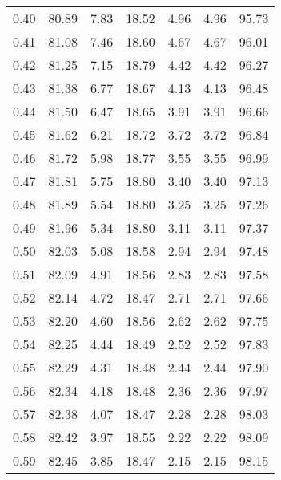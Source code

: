 \begin{tabular}{|c|c|c|c|c|c|c|}
      0.40 &     80.89 &      7.83 &      18.52 &    4.96 &       4.96 &         95.73 \\
      0.41 &     81.08 &      7.46 &      18.60 &    4.67 &       4.67 &         96.01 \\
      0.42 &     81.25 &      7.15 &      18.79 &    4.42 &       4.42 &         96.27 \\
      0.43 &     81.38 &      6.77 &      18.67 &    4.13 &       4.13 &         96.48 \\
      0.44 &     81.50 &      6.47 &      18.65 &    3.91 &       3.91 &         96.66 \\
      0.45 &     81.62 &      6.21 &      18.72 &    3.72 &       3.72 &         96.84 \\
      0.46 &     81.72 &      5.98 &      18.77 &    3.55 &       3.55 &         96.99 \\
      0.47 &     81.81 &      5.75 &      18.80 &    3.40 &       3.40 &         97.13 \\
      0.48 &     81.89 &      5.54 &      18.80 &    3.25 &       3.25 &         97.26 \\
      0.49 &     81.96 &      5.34 &      18.80 &    3.11 &       3.11 &         97.37 \\
      0.50 &     82.03 &      5.08 &      18.58 &    2.94 &       2.94 &         97.48 \\
      0.51 &     82.09 &      4.91 &      18.56 &    2.83 &       2.83 &         97.58 \\
      0.52 &     82.14 &      4.72 &      18.47 &    2.71 &       2.71 &         97.66 \\
      0.53 &     82.20 &      4.60 &      18.56 &    2.62 &       2.62 &         97.75 \\
      0.54 &     82.25 &      4.44 &      18.49 &    2.52 &       2.52 &         97.83 \\
      0.55 &     82.29 &      4.31 &      18.48 &    2.44 &       2.44 &         97.90 \\
      0.56 &     82.34 &      4.18 &      18.48 &    2.36 &       2.36 &         97.97 \\
      0.57 &     82.38 &      4.07 &      18.47 &    2.28 &       2.28 &         98.03 \\
      0.58 &     82.42 &      3.97 &      18.55 &    2.22 &       2.22 &         98.09 \\
      0.59 &     82.45 &      3.85 &      18.47 &    2.15 &       2.15 &         98.15 \\

\end{tabular}
